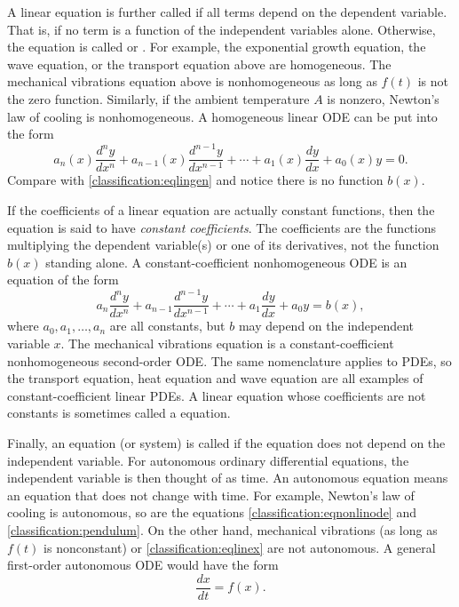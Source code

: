 \medskip

A linear equation is further called \emph{} if
all terms depend on the dependent variable.  That is, if no
term is a function of the independent variables alone.  Otherwise, the
equation is called \emph{} or
\emph{}.  For example,
the exponential growth equation, the wave equation, or the transport equation above
are homogeneous. The mechanical vibrations equation above is nonhomogeneous
as long as $f(t)$ is not the zero function.  Similarly, if the ambient temperature $A$ is nonzero,
Newton's law of cooling is nonhomogeneous.
A homogeneous linear ODE can be put into the form
\begin{equation*}
a_n(x) \frac{d^n y}{dx^n} + 
a_{n-1}(x) \frac{d^{n-1} y}{dx^{n-1}} + 
\cdots
+
a_{1}(x) \frac{dy}{dx}
+
a_{0}(x) y = 0 .
\end{equation*}
Compare with \eqref{classification:eqlingen} and notice there is no
function $b(x)$.

\medskip

If the coefficients of a linear equation are actually constant functions,
then the equation is said to have
\emph{constant coefficients}.
The coefficients are the functions multiplying the dependent
variable(s) or one of its derivatives, not the function $b(x)$ standing alone.
A constant-coefficient nonhomogeneous ODE is an equation of the form
\begin{equation*}
a_n \frac{d^n y}{dx^n} + 
a_{n-1} \frac{d^{n-1} y}{dx^{n-1}} + 
\cdots
+
a_{1} \frac{dy}{dx}
+
a_{0} y = b(x) ,
\end{equation*}
where $a_0, a_1, \ldots, a_n$ are all constants,
but $b$ may depend on 
the independent variable $x$.
The mechanical vibrations equation
is a constant-coefficient nonhomogeneous second-order ODE\@.
The same nomenclature applies to PDEs, so the transport equation,
heat equation and wave equation are all examples of
constant-coefficient linear PDEs.
A linear equation whose coefficients are not constants is sometimes
called a \emph{} equation.

\medskip

Finally, an equation (or system) is called \emph{}
if the equation does not depend on the independent variable.
For autonomous ordinary differential equations, the
independent variable is then thought of as time.
An autonomous equation
means an equation that does not change with time.
For example, Newton's law of cooling is autonomous, so are the equations
\eqref{classification:eqnonlinode} and
\eqref{classification:pendulum}.  On the other hand, mechanical
vibrations (as long as $f(t)$ is nonconstant) or 
\eqref{classification:eqlinex} are not autonomous.
A general
first-order autonomous ODE would have the form
\begin{equation*}
\frac{dx}{dt} = f(x) .
\end{equation*}

